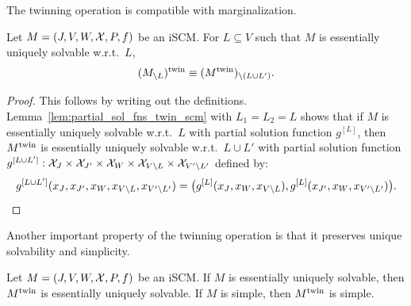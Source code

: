 The twinning operation is compatible with marginalization.
\begin{Prp}\label{prp:twinning_marginalization_commute}
Let $M = \left ( J, V, W, \mathcal{X}, P, f \right )$ be an iSCM.
For $L \subseteq V$ such that $M$ is essentially uniquely solvable w.r.t.\ $L$,
$$(M_{\setminus L})^{\mathrm{twin}} \equiv (M^{\mathrm{twin}})_{\setminus (L\cup L')}.$$
\end{Prp}
\begin{proof}
  This follows by writing out the definitions.
  Lemma~\ref{lem:partial_sol_fns_twin_scm} with $L_1=L_2=L$ shows that if $M$ is essentially uniquely solvable w.r.t.\ $L$ with partial solution function $g^{[L]}$, then $M^{\mathrm{twin}}$ is essentially uniquely solvable w.r.t.\ $L \cup L'$ with partial solution function $g^{[L\cup L']} : \mathcal{X}_J \times \mathcal{X}_{J'} \times \mathcal{X}_W \times \mathcal{X}_{V \setminus L} \times \mathcal{X}_{V' \setminus L'}$ defined by:
    $$g^{[L\cup L']}(x_J,x_{J'},x_W,x_{V\setminus L},x_{V'\setminus L'}) = \big(g^{[L]}(x_J,x_W,x_{V\setminus L}), g^{[L]}(x_{J'},x_W,x_{V'\setminus L'})\big).$$
\end{proof}
Another important property of the twinning operation is that it preserves unique solvability and simplicity.
\begin{Cor}\label{prp:twin_scm_simple}
Let $M = \left ( J, V, W, \mathcal{X}, P, f \right )$ be an iSCM.
If $M$ is essentially uniquely solvable, then $M^{\mathrm{twin}}$ is essentially uniquely solvable.
If $M$ is simple, then $M^{\mathrm{twin}}$ is simple.
\end{Cor}
